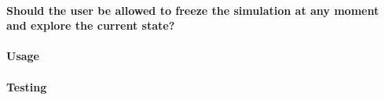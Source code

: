 \hypertarget{should-the-user-be-allowed-to-freeze-the-simulation-at-any-moment-and-explore-the-current-state}{%
\paragraph{Should the user be allowed to freeze the simulation at any
moment and explore the current
state?}\label{should-the-user-be-allowed-to-freeze-the-simulation-at-any-moment-and-explore-the-current-state}}

\hypertarget{usage}{%
\paragraph{Usage}\label{usage}}

\hypertarget{testing}{%
\paragraph{Testing}\label{testing}}
